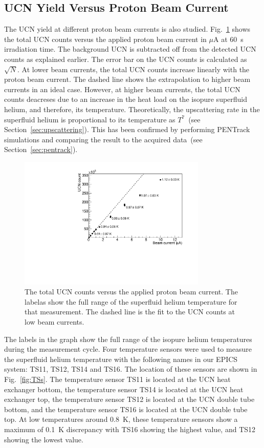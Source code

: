 \subsection{UCN Yield Versus Proton Beam Current}
The UCN yield at different proton beam currents is also
studied. Fig.~\ref{fig:counts_vs_beam} shows the total UCN counts
versus the applied proton beam current in $\mu$A at 60~s irradiation
time. The background UCN is subtracted off from the detected UCN
counts as explained earlier. The error bar on the UCN counts is
calculated as $\sqrt{N}$. At lower beam currents, the total UCN counts
increase linearly with the proton beam current. The dashed line shows
the extrapolation to higher beam currents in an ideal case. However,
at higher beam currents, the total UCN counts deacreses due to an
increase in the heat load on the isopure superfluid helium, and
therefore, its temperature. Theoretically, the upscattering rate in
the superfluid helium is proportional to its temperature as $T^7$~(see
Section~\ref{sec:upscattering}). This has been confirmed by performing
PENTrack simulations and comparing the result to the acquired
data~(see Section~\ref{sec:pentrack}).



\begin{figure}[h!]
  \centering
  \includegraphics[width=0.8\textwidth]{UCNCounts_vs_Beam.pdf}
  \caption{The total UCN counts versus the applied proton beam
    current. The labelas show the full range of the superfluid helium
    temperature for that measurement. The dashed line is the fit to
    the UCN counts at low beam currents.}
  \label{fig:counts_vs_beam}
\end{figure}


The labels in the graph show the full range of the isopure helium
temperatures during the measurement cycle. Four temperature sensors
were used to measure the superfluid helium temperature with the
following names in our EPICS system: TS11, TS12, TS14 and TS16. The
location of these sensors are shown in Fig.~\ref{fig:TSs}. The
temperature sensor TS11 is located at the UCN heat exchanger bottom,
the temperature sensor TS14 is located at the UCN heat exchanger top,
the temperature sensor TS12 is located at the UCN double tube bottom,
and the temperature sensor TS16 is located at the UCN double tube
top. At low temperatures around 0.8~K, these temperature sensors show
a maximum of 0.1~K discrepancy with TS16 showing the highest value,
and TS12 showing the lowest value.



